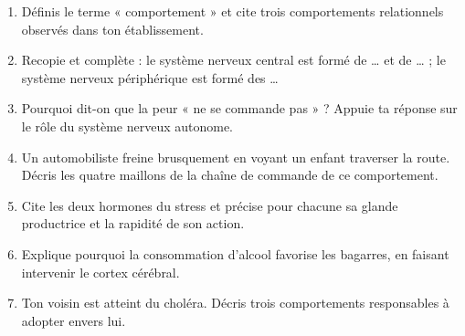 \documentclass[11pt]{article}
\begin{document}
\begin{exercice}
\begin{enumerate}
\item Définis le terme « comportement » et cite trois comportements relationnels observés dans ton établissement.
\item Recopie et complète : le système nerveux central est formé de \ldots{} et de \ldots{} ; le système nerveux périphérique est formé des \ldots{}
\item Pourquoi dit-on que la peur « ne se commande pas » ? Appuie ta réponse sur le rôle du système nerveux autonome.
\item Un automobiliste freine brusquement en voyant un enfant traverser la route. Décris les quatre maillons de la chaîne de commande de ce comportement.
\item Cite les deux hormones du stress et précise pour chacune sa glande productrice et la rapidité de son action.
\item Explique pourquoi la consommation d'alcool favorise les bagarres, en faisant intervenir le cortex cérébral.
\item Ton voisin est atteint du choléra. Décris trois comportements responsables à adopter envers lui.
\end{enumerate}
\end{exercice}
\end{document}
